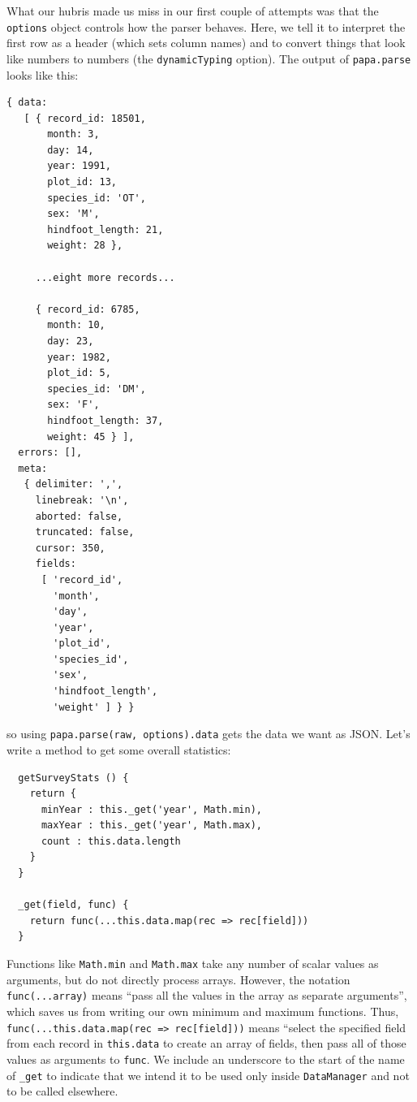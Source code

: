 What our hubris made us miss in our first couple of attempts was that
the \texttt{options} object controls how the parser behaves. Here, we
tell it to interpret the first row as a header (which sets column names)
and to convert things that look like numbers to numbers (the
\texttt{dynamicTyping} option). The output of \texttt{papa.parse} looks
like this:

\begin{verbatim}
{ data:
   [ { record_id: 18501,
       month: 3,
       day: 14,
       year: 1991,
       plot_id: 13,
       species_id: 'OT',
       sex: 'M',
       hindfoot_length: 21,
       weight: 28 },

     ...eight more records...

     { record_id: 6785,
       month: 10,
       day: 23,
       year: 1982,
       plot_id: 5,
       species_id: 'DM',
       sex: 'F',
       hindfoot_length: 37,
       weight: 45 } ],
  errors: [],
  meta:
   { delimiter: ',',
     linebreak: '\n',
     aborted: false,
     truncated: false,
     cursor: 350,
     fields:
      [ 'record_id',
        'month',
        'day',
        'year',
        'plot_id',
        'species_id',
        'sex',
        'hindfoot_length',
        'weight' ] } }
\end{verbatim}

so using \texttt{papa.parse(raw,\ options).data} gets the data we want
as JSON. Let's write a method to get some overall statistics:

\begin{verbatim}
  getSurveyStats () {
    return {
      minYear : this._get('year', Math.min),
      maxYear : this._get('year', Math.max),
      count : this.data.length
    }
  }

  _get(field, func) {
    return func(...this.data.map(rec => rec[field]))
  }
\end{verbatim}

Functions like \texttt{Math.min} and \texttt{Math.max} take any number
of scalar values as arguments, but do not directly process arrays.
However, the notation \texttt{func(...array)} means ``pass all the
values in the array as separate arguments'', which saves us from writing
our own minimum and maximum functions. Thus,
\texttt{func(...this.data.map(rec\ =\textgreater{}\ rec{[}field{]}))}
means ``select the specified field from each record in
\texttt{this.data} to create an array of fields, then pass all of those
values as arguments to \texttt{func}. We include an underscore to the
start of the name of \texttt{\_get} to indicate that we intend it to be
used only inside \texttt{DataManager} and not to be called elsewhere.

